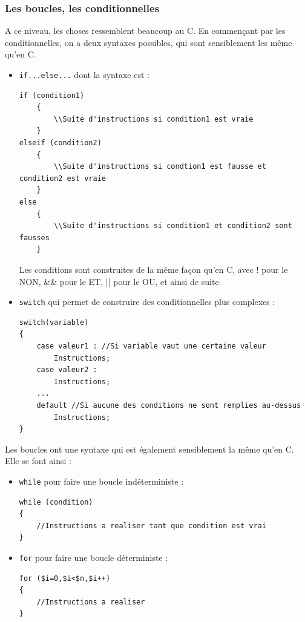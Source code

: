 \documentclass{article}
\begin{document}
\subsubsection{Les boucles, les conditionnelles}
A ce niveau, les choses ressemblent beaucoup au C. En commençant par les conditionnelles, on a deux syntaxes possibles, qui sont sensiblement les même qu'en C.
\begin{itemize}
	\item \texttt{if...else...} dont la syntaxe est :
		\begin{lstlisting}
if (condition1)
	{
		\\Suite d'instructions si condition1 est vraie
	}
elseif (condition2)
	{
		\\Suite d'instructions si condtion1 est fausse et condition2 est vraie
	}
else
	{
		\\Suite d'instructions si condition1 et condition2 sont fausses
	}
		\end{lstlisting}
		Les conditions sont construites de la même façon qu'en C, avec ! pour le NON, \&\& pour le ET, || pour le OU, et ainsi de suite. 

		\bigskip
	\item \texttt{switch} qui permet de construire des conditionnelles plus complexes :
		\begin{lstlisting}
switch(variable)
{
	case valeur1 : //Si variable vaut une certaine valeur
		Instructions;
	case valeur2 :
		Instructions;
	...
	default //Si aucune des conditions ne sont remplies au-dessus
		Instructions;
}
		\end{lstlisting}

\end{itemize}

\bigskip
Les boucles ont une syntaxe qui est également sensiblement la même qu'en C. Elle se font ainsi :
\begin{itemize}
	\item \texttt{while} pour faire une boucle indéterministe :
		\newpage
		\begin{lstlisting}
while (condition)
{
	//Instructions a realiser tant que condition est vrai
}
		\end{lstlisting}

		\bigskip
	\item \texttt{for} pour faire une boucle déterministe :
		\begin{lstlisting}
for ($i=0,$i<$n,$i++)
{
	//Instructions a realiser
}
		\end{lstlisting}
\end{itemize}
\end{document}
